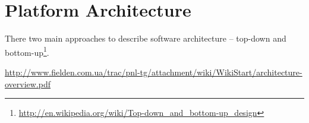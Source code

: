 \chapter{Platform Architecture}\label{ch01:01}

  There two main approaches to describe software architecture -- top-down and bottom-up\footnote{\url{http://en.wikipedia.org/wiki/Top-down_and_bottom-up_design}}.

\url{http://www.fielden.com.ua/trac/pnl-tg/attachment/wiki/WikiStart/architecture-overview.pdf}

% 
% 
% 
% 
% 
